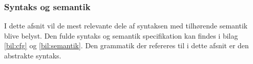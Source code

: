 \subsubsection{Syntaks og semantik}\label{sec:Syntax}
I dette afsnit vil de mest relevante dele af syntaksen med tilhørende semantik blive belyst. Den fulde syntaks og semantik specifikation kan findes i bilag \ref{bil:cfg} og \ref{bil:semantik}. Den grammatik der refereres til i dette afsnit er den abstrakte syntaks.



%

